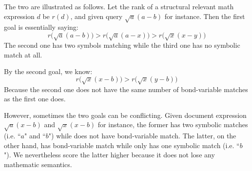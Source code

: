 \documentclass{acm_proc_article-sp}
\begin{document}
The two are illustrated as follows. 
Let the rank of a structural relevant math expression $d$ be $r(d)$, and given query $\sqrt a (a - b)$ for instance. 
Then the first goal is essentially saying: 
$$
r\big(\sqrt a (a - b)\big) > r\big(\sqrt a (a - x)\big) > r\big(\sqrt x (x - y)\big)
$$
The second one has two symbols matching while the third one has no symbolic match at all. 

By the second goal, we know:
$$
r\big(\sqrt x (x - b)\big) > r\big(\sqrt x (y - b)\big)
$$
Because the second one does not have the same number of bond-variable matches as the first one does.

However, sometimes the two goals can be conflicting.
Given document expression $\sqrt a (x - b)$ and $\sqrt x (x - b)$ for instance, the former has two symbolic matches (i.e. ``$a$" and ``$b$") while does not have bond-variable match. The latter, on the other hand, has bond-variable match while only has one symbolic match (i.e. ``$b$"). 
We nevertheless score the latter higher because it does not lose any mathematic semantics. 
\end{document}
